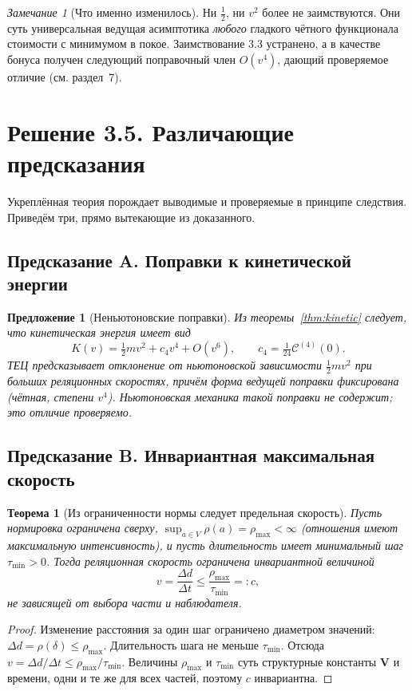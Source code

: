 \documentclass[12pt,a4paper]{article}
\theoremstyle{definition}
\theoremstyle{plain}
\newtheorem{theorem}{Теорема}[section]
\newtheorem{proposition}{Предложение}[section]
\theoremstyle{remark}
\newtheorem{remark}{Замечание}[section]
\newcommand{\Values}{V}
\newcommand{\Vstruct}{\mathbf V}
\newcommand{\norm}{\rho}
\newcommand{\Cost}{\mathcal C}
\begin{document}
\begin{remark}[Что именно изменилось]
Ни $\tfrac12$, ни $v^2$ более не заимствуются. Они суть универсальная ведущая
асимптотика \emph{любого} гладкого чётного функционала стоимости с минимумом в
покое. Заимствование 3.3 устранено, а в качестве бонуса получен следующий
поправочный член $O(v^4)$, дающий проверяемое отличие (см. раздел~7).
\end{remark}

\section{Решение 3.5. Различающие предсказания}

Укреплённая теория порождает выводимые и проверяемые в принципе следствия. Приведём
три, прямо вытекающие из доказанного.

\subsection{Предсказание A. Поправки к кинетической энергии}

\begin{proposition}[Неньютоновские поправки]
Из теоремы~\ref{thm:kinetic} следует, что кинетическая энергия имеет вид
\[
K(v)=\tfrac12 m v^2+c_4 v^4+O(v^6),\qquad c_4=\tfrac{1}{24}\Cost^{(4)}(0).
\]
ТЕЦ предсказывает отклонение от ньютоновской зависимости $\tfrac12 m v^2$ при больших
реляционных скоростях, причём \emph{форма} ведущей поправки фиксирована (чётная,
степени $v^4$). Ньютоновская механика такой поправки не содержит; это отличие
проверяемо.
\end{proposition}

\subsection{Предсказание B. Инвариантная максимальная скорость}

\begin{theorem}[Из ограниченности нормы следует предельная скорость]
Пусть нормировка ограничена сверху, $\displaystyle\sup_{a\in\Values}\norm(a)=\norm_{\max}<\infty$
(отношения имеют максимальную интенсивность), и пусть длительность имеет минимальный
шаг $\tau_{\min}>0$. Тогда реляционная скорость ограничена инвариантной величиной
\[
v=\frac{\Delta d}{\Delta t}\le\frac{\norm_{\max}}{\tau_{\min}}=:c,
\]
не зависящей от выбора части и наблюдателя.
\end{theorem}

\begin{proof}
Изменение расстояния за один шаг ограничено диаметром значений:
$\Delta d=\norm(\delta)\le\norm_{\max}$. Длительность шага не меньше $\tau_{\min}$.
Отсюда $v=\Delta d/\Delta t\le\norm_{\max}/\tau_{\min}$. Величины $\norm_{\max}$ и
$\tau_{\min}$ суть структурные константы $\Vstruct$ и времени, одни и те же для всех
частей, поэтому $c$ инвариантна.
\end{proof}
\end{document}
